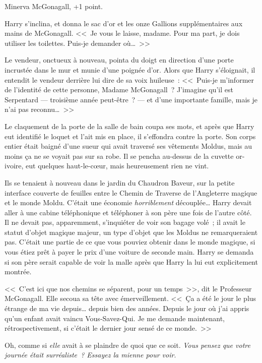 Minerva McGonagall, +1 point.

Harry s'inclina, et donna le sac d'or et les onze Gallions supplémentaires aux mains de McGonagall. <<~Je vous le laisse, madame. Pour ma part, je dois utiliser les toilettes. Puis-je demander où…~>>

Le vendeur, onctueux à nouveau, pointa du doigt en direction d'une porte incrustée dans le mur et munie d'une poignée d'or. Alors que Harry s'éloignait, il entendit le vendeur derrière lui dire de sa voix huileuse~: <<~Puis-je m'informer de l'identité de cette personne, Madame McGonagall~? J'imagine qu'il est Serpentard — troisième année peut-être~? — et d'une importante famille, mais je n'ai pas reconnu…~>>

Le claquement de la porte de la salle de bain coupa ses mots, et après que Harry eut identifié le loquet et l'ait mis en place, il s'effondra contre la porte. Son corps entier était baigné d'une sueur qui avait traversé ses vêtements Moldus, mais au moins ça ne se voyait pas sur sa robe. Il se pencha au-dessus de la cuvette or-ivoire, eut quelques haut-le-cœur, mais heureusement rien ne vint.

\later

Ils se tenaient à nouveau dans le jardin du Chaudron Baveur, sur la petite interface couverte de feuilles entre le Chemin de Traverse de l'Angleterre magique et le monde Moldu. C'était une économie \emph{horriblement} découplée… Harry devait aller à une cabine téléphonique et téléphoner à son père une fois de l'autre côté. Il ne devait pas, apparemment, s'inquiéter de voir son bagage volé~; il avait le statut d'objet magique majeur, un type d'objet que les Moldus ne remarqueraient pas. C'était une partie de ce que vous pouviez obtenir dans le monde magique, si vous étiez prêt à payer le prix d'une voiture de seconde main. Harry se demanda si son père serait capable de voir la malle après que Harry la lui eut explicitement montrée.

<<~C'est ici que nos chemins se séparent, pour un temps~>>, dit le Professeur McGonagall. Elle secoua sa tête avec émerveillement. <<~Ça a été le jour le plus étrange de ma vie depuis… depuis bien des années. Depuis le jour où j'ai appris qu'un enfant avait vaincu Vous-Savez-Qui. Je me demande maintenant, rétrospectivement, si c'était le dernier jour sensé de ce monde.~>>

Oh, comme si \emph{elle} avait à se plaindre de quoi que ce soit. \emph{Vous pensez que votre journée était surréaliste~? Essayez la mienne pour voir}.

